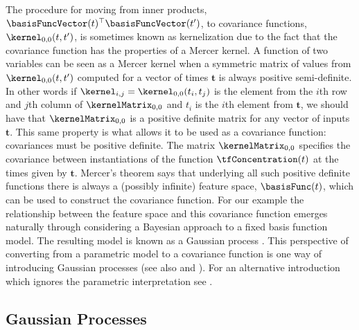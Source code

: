 \documentclass{article}
\begin{document}
The procedure for moving from inner products,
$\basisFuncVector(t)^\top\basisFuncVector(t^\prime)$, to covariance functions,
$\kernel_{0,0}(t, t^\prime)$, is sometimes known as kernelization
\citep{Scholkopf:learning01} due to the fact that the covariance
function has the properties of a Mercer kernel. A function of two variables can be seen as a Mercer kernel when a
symmetric matrix of values from $\kernel_{0,0}(t, t^\prime)$ computed
for a vector of times $\mathbf{t}$ is always positive
semi-definite. In other words if $\kernel_{i,j} = \kernel_{0,0}(t_i,
t_j)$ is the element from the $i$th row and $j$th column of
$\kernelMatrix_{0,0}$ and $t_i$ is the $i$th element from $\mathbf{t}$, we
should have that $\kernelMatrix_{0,0}$ is a positive definite matrix for any
vector of inputs $\mathbf{t}$. This same property is what allows it to
be used as a covariance function: covariances must be positive
definite. The matrix $\kernelMatrix_{0,0}$ specifies the covariance between
instantiations of the function $\tfConcentration(t)$ at the times
given by $\mathbf{t}$. Mercer's theorem says that underlying all such
positive definite functions there is always a (possibly infinite)
feature space, $\basisFunc(t)$, which can be used to construct the
covariance function. For our example the relationship between the
feature space and this covariance function emerges naturally through
considering a Bayesian approach to a fixed basis function model. The
resulting model is known as a Gaussian process
\citep{Ohagan:curve78}. This perspective of converting from a
parametric model to a covariance function is one way of introducing
Gaussian processes (see also \citet{Williams:Gaussian95} and
\citet{Rasmussen:book06}). For an alternative introduction which
ignores the parametric interpretation see
\citet{Lawrence:licsbgp10}. 


\subsection{Gaussian Processes}
\end{document}
